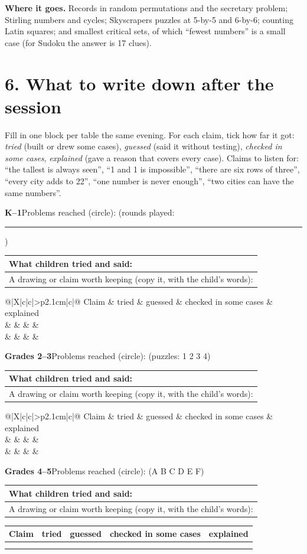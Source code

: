 \documentclass[11pt]{extarticle}
\begin{document}
\textbf{Where it goes.} Records in random permutations and the secretary problem; Stirling numbers and cycles; Skyscrapers puzzles at 5-by-5 and 6-by-6; counting Latin squares; and smallest critical sets, of which ``fewest numbers'' is a small case (for Sudoku the answer is 17 clues).

\newpage
\section{6. What to write down after the session}

Fill in one block per table the same evening. For each claim, tick how far it got: \emph{tried} (built or drew some cases), \emph{guessed} (said it without testing), \emph{checked in some cases}, \emph{explained} (gave a reason that covers every case). Claims to listen for: ``the tallest is always seen'', ``1 and 1 is impossible'', ``there are six rows of three'', ``every city adds to 22'', ``one number is never enough'', ``two cities can have the same numbers''.

\newcommand{\recblock}[2]{%
\noindent\textbf{#1}\quad Problems reached (circle):\enspace #2\par\vspace{2pt}
\noindent\begin{tabularx}{\linewidth}{@{}|X|@{}}
\hline
\small What children tried and said:\\[1.25cm]
\hline
\small A drawing or claim worth keeping (copy it, with the child's words):\\[1.05cm]
\hline
\end{tabularx}\par\vspace{2pt}
\noindent\begin{tabularx}{\linewidth}{@{}|X|c|c|>{\centering\arraybackslash}p{2.1cm}|c|@{}}
\hline
\small Claim & \small tried & \small guessed & \small checked in some cases & \small explained \\
\hline
 & & & & \\[0.2cm] \hline
 & & & & \\[0.2cm] \hline
\end{tabularx}\par\vspace{6pt}}

\recblock{K--1}{1 (rounds played: \rule{1cm}{0.4pt})}
\recblock{Grades 2--3}{1 (puzzles: 1 2 3 4)}
\recblock{Grades 4--5}{1 (A B C D E F)\enspace 4\enspace 5\enspace 6\enspace 7\enspace 8\enspace 9}
\end{document}
